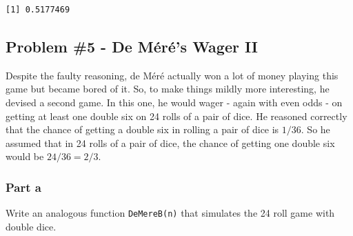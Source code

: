 \documentclass[
  letterpaper,
  DIV=11,
  numbers=noendperiod]{scrartcl}
\begin{document}
\begin{verbatim}
[1] 0.5177469
\end{verbatim}

\hypertarget{problem-5---de-muxe9ruxe9s-wager-ii}{%
\subsection{Problem \#5 - De Méré's Wager
II}\label{problem-5---de-muxe9ruxe9s-wager-ii}}

Despite the faulty reasoning, de Méré actually won a lot of money
playing this game but became bored of it. So, to make things mildly more
interesting, he devised a second game. In this one, he would wager -
again with even odds - on getting at least one double six on 24 rolls of
a pair of dice. He reasoned correctly that the chance of getting a
double six in rolling a pair of dice is \(1/36\). So he assumed that in
24 rolls of a pair of dice, the chance of getting one double six would
be \(24/36=2/3\).

\hypertarget{part-a-4}{%
\subsubsection{Part a}\label{part-a-4}}

Write an analogous function \texttt{DeMereB(n)} that simulates the 24
roll game with double dice.
\end{document}
